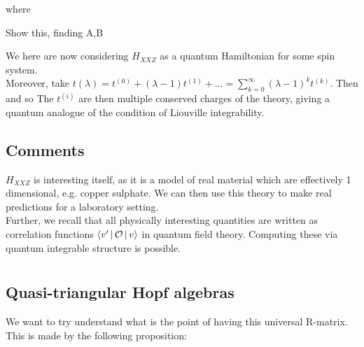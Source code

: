 \documentclass{article}
\begin{document}
where 

\begin{ex}
Show this, finding A,B
\end{ex}
We here are now considering $H_{XXZ}$ as a quantum Hamiltonian for some spin system. \\
Moreover, take $t(\lambda) = t^{(0)} + (\lambda-1)t^{(1)} + \dots = \sum_{k=0}^\infty (\lambda -1)^k t^{(k)}$. Then 
and so 
The $t^{(i)}$ are then multiple conserved charges of the theory, giving a quantum analogue of the condition of Liouville integrability. 

\subsection{Comments}
$H_{XXZ}$ is interesting itself, as it is a model of real material which are effectively 1 dimensional, e.g. copper sulphate. We can then use this theory to make real predictions for a laboratory setting. \\
Further, we recall that all physically interesting quantities are written as correlation functions $\left\langle v^\prime \, | \, \mathcal{O} \, | \, v \right\rangle$ in quantum field theory. Computing these via quantum integrable structure is possible. 
\section{}

\subsection{Quasi-triangular Hopf algebras}
We want to try understand what is the point of having this universal R-matrix. This is made by the following proposition:
\end{document}
